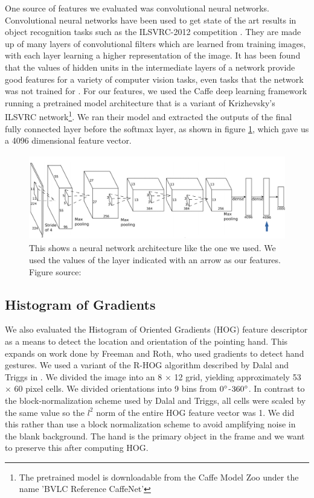 \documentclass[10pt,twocolumn,letterpaper]{article}
\begin{document}
One source of features we evaluated was convolutional neural networks.  Convolutional neural networks have been used to get state of the art results in object recognition tasks such as the ILSVRC-2012 competition \cite{krizhevsky2012imagenet}.  They are made up of many layers of convolutional filters which are learned from training images, with each layer learning a higher representation of the image.   It has been found that the values of hidden units in the intermediate layers of a network provide good features for a variety of computer vision tasks, even tasks that the network was not trained for \cite{donahue2013decaf}.  For our features, we used the Caffe deep learning framework\cite{jia2014caffe} running a pretrained model architecture that is a variant of Krizhevsky's ILSVRC network\cite{krizhevsky2012imagenet}\footnote{The pretrained model is downloadable from the Caffe Model Zoo under the name 'BVLC Reference CaffeNet'}.  We ran their model and extracted the outputs of the final fully connected layer before the softmax layer, as shown in figure \ref{fig:cnn}, which gave us a 4096 dimensional feature vector.

\begin{figure}[b]
	\begin{center}
		\includegraphics[height=140px]{figures/cnn.png}
	\end{center}
	\caption{This shows a neural network architecture like the one we used.  We used the values of the layer indicated with an arrow as our features.  Figure source: \cite{krizhevsky2012presentation}}
	\label{fig:cnn}
\end{figure}

\subsection{Histogram of Gradients}

We also evaluated the Histogram of Oriented Gradients (HOG) feature descriptor \cite{dalal2005histograms} as a means to detect the location and orientation of the pointing hand. This expands on work done by Freeman and Roth, who used gradients to detect hand gestures\cite{freeman1995orientation}. We used a variant of the R-HOG algorithm described by Dalal and Triggs in \cite{dalal2005histograms}. We divided the image into an 8 $\times$ 12 grid, yielding approximately 53 $\times$ 60 pixel cells. We divided orientations into 9 bins from $0\degree$-$360\degree$. In contrast to the block-normalization scheme used by Dalal and Triggs, all cells were scaled by the same value so the $l^2$ norm of the entire HOG feature vector was 1.
We did this rather than use a block normalization scheme to avoid amplifying noise in the blank background. The hand is the primary object in the frame and we want to preserve this after computing HOG.
\end{document}

